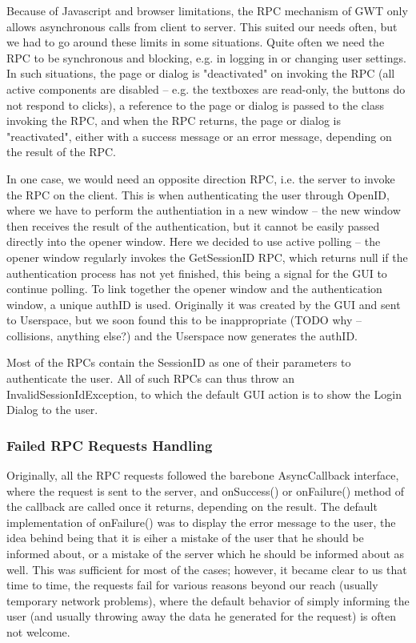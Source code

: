 Because of Javascript and browser limitations, the RPC mechanism of GWT only allows asynchronous calls from client to server. This suited our needs often, but we had to go around these limits in some situations. Quite often we need the RPC to be synchronous and blocking, e.g. in logging in or changing user settings. In such situations, the page or dialog is "deactivated" on invoking the RPC (all active components are disabled -- e.g. the textboxes are read-only, the buttons do not respond to clicks), a reference to the page or dialog is passed to the class invoking the RPC, and when the RPC returns, the page or dialog is "reactivated", either with a success message or an error message, depending on the result of the RPC.

In one case, we would need an opposite direction RPC, i.e. the server to invoke the RPC on the client. This is when authenticating the user through OpenID, where we have to perform the authentiation in a new window -- the new window then receives the result of the authentication, but it cannot be easily passed directly into the opener window. Here we decided to use active polling -- the opener window regularly invokes the GetSessionID RPC, which returns null if the authentication process has not yet finished, this being a signal for the GUI to continue polling. To link together the opener window and the authentication window, a unique authID is used. Originally it was created by the GUI and sent to Userspace, but we soon found this to be inappropriate (TODO why -- collisions, anything else?) and the Userspace now generates the authID.

Most of the RPCs contain the SessionID as one of their parameters to authenticate the user. All of such RPCs can thus throw an InvalidSessionIdException, to which the default GUI action is to show the Login Dialog to the user.

\subsubsection{Failed RPC Requests Handling}

Originally, all the RPC requests followed the barebone AsyncCallback interface, where the request is sent to the server, and onSuccess() or onFailure() method of the callback are called once it returns, depending on the result. The default implementation of onFailure() was to display the error message to the user, the idea behind being that it is eiher a mistake of the user that he should be informed about, or a mistake of the server which he should be informed about as well. This was sufficient for most of the cases; however, it became clear to us that time to time, the requests fail for various reasons beyond our reach (usually temporary network problems), where the default behavior of simply informing the user (and usually throwing away the data he generated for the request) is often not welcome.

